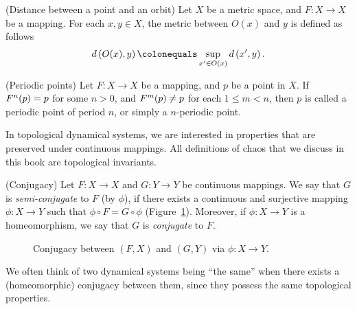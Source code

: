 \documentclass[10pt,twoside,draft]{book}
\begin{document}
\begin{definition}
  (Distance between a point and an orbit)
  Let $X$ be a metric space, and $F: X \to X$ be a mapping.
  For each $x,y \in X$, the metric between $O(x)$ and $y$ is defined as follows
  \begin{equation*}
    \metric{O(x),y} \ceq \sup\limits_{x' \in O(x)} \metric{x',y}.
  \end{equation*}
\end{definition}
\begin{definition}
  (Periodic points)
  Let $F: X \to X$ be a mapping, and $p$ be a point in $X$.
  If $F^{n}(p) = p$ for some $n > 0$, and $F^{m}(p) \neq p$ for each $1 \leq m < n$, then $p$ is called a periodic point of period $n$, or simply a $n$-periodic point.
  \label{def:porbit}
\end{definition}

In topological dynamical systems, we are interested in properties that are preserved under continuous mappings.
All definitions of chaos that we discuss in this book are topological invariants.
\begin{definition}
  (Conjugacy)
  Let $F: X \to X$ and $G: Y \to Y$ be continuous mappings.
  We say that $G$ is \textit{semi-conjugate} to $F$ (by $\phi$), if there exists a continuous and surjective mapping $\phi: X \to Y$ such that $\phi\circ F = G\circ\phi$ (Figure~\ref{fig:conj}).
  Moreover, if $\phi: X \to Y$ is a homeomorphism, we say that $G$ is \textit{conjugate} to $F$.
\end{definition}
\begin{figure}[ht]
  \centering
  \caption{Conjugacy between $(F, X)$ and $(G, Y)$ via $\phi: X \to Y$.}
  \label{fig:conj}
\end{figure}
We often think of two dynamical systems being ``the same'' when there exists a (homeomorphic) conjugacy between them, since they possess the same topological properties.




\printindex
\end{document}
